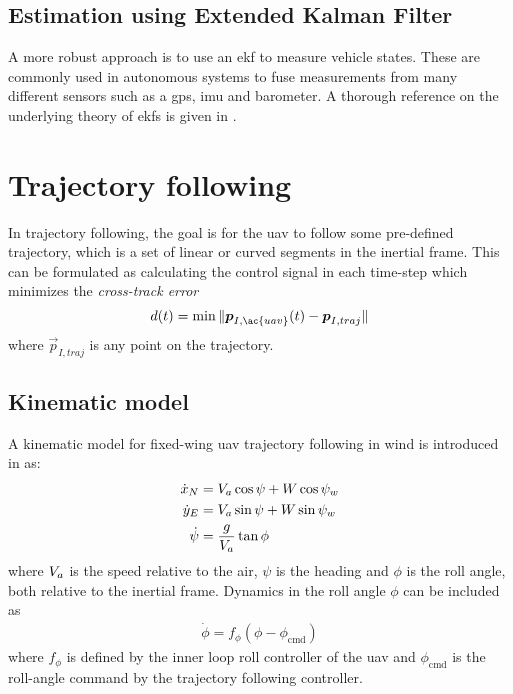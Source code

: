 \subsection{Estimation using Extended Kalman Filter}\label{sec:wind_ekf}
A more robust approach is to use an \ac{ekf} to measure vehicle states. These are 
commonly used in autonomous systems to fuse measurements from many different sensors such as a \ac{gps}, \ac{imu} and barometer. 
A thorough reference on the underlying theory of \acp{ekf} is given in \cite{sensor_fusion}.

\section{Trajectory following}
In trajectory following, the goal is for the \ac{uav} to follow some pre-defined trajectory, which is a set of 
linear or curved segments in the inertial frame. This can be formulated as calculating the control signal 
in each time-step which minimizes the \textit{cross-track error}
\begin{equation}
    d(t)=\min\|\vec{p}_{I,\ac{uav}}(t)-\vec{p}_{I,traj}\|
\end{equation}
where $\vec{p}_{I,traj}$ is any point on the trajectory. 

\subsection{Kinematic model}
A kinematic model for fixed-wing \ac{uav} trajectory following in wind is introduced in \cite{uav_dynamics_wind} as:
\begin{align}\label{eq:traj_model}
    \dot{x}_N &= V_a\cos\psi + W\cos\psi_w \\
    \dot{y}_E &= V_a\sin\psi + W\sin\psi_w \\
    \dot{\psi} &= \frac{g}{V_a}\tan\phi
\end{align}
where $V_a$ is the speed relative to the air, $\psi$ is the heading and $\phi$ is the roll angle, both relative to the inertial frame.
Dynamics in the roll angle $\phi$ can be included as
\begin{align}
    \dot{\phi} = f_\phi(\phi-\phi_{\text{cmd}})
\end{align}
where $f_\phi$ is defined by the inner loop roll controller of the \ac{uav} and $\phi_{\text{cmd}}$ is the roll-angle command by the
trajectory following controller.

